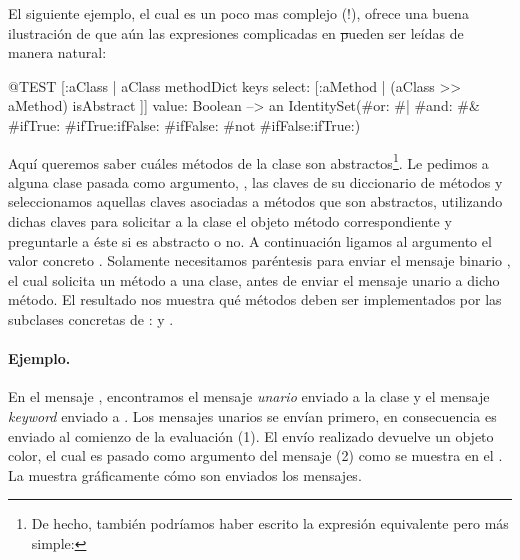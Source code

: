 \documentclass[a4paper,10pt,twoside]{book}
\begin{document}
El siguiente ejemplo, el cual es un poco mas complejo (!), ofrece una buena ilustraci\'on de que a\'un las expresiones complicadas en \st pueden ser le\'idas de manera natural:
\begin{code}{@TEST}
[:aClass | aClass methodDict keys select: [:aMethod | (aClass >> aMethod) isAbstract ]] value: Boolean --> an IdentitySet(#or: #| #and: #& #ifTrue: #ifTrue:ifFalse: #ifFalse: #not #ifFalse:ifTrue:)
\end{code}
\noindent
Aqu\'i queremos saber cu\'ales m\'etodos de la clase  son abstractos\footnote{De hecho, tambi\'en podr\'iamos haber escrito la expresi\'on equivalente pero m\'as simple: }.
Le pedimos a alguna clase pasada como argumento, , las claves de su diccionario de m\'etodos y seleccionamos aquellas claves asociadas a m\'etodos que son abstractos, utilizando dichas claves para solicitar a la clase el objeto m\'etodo correspondiente y preguntarle a \'este si es abstracto o no.
A continuaci\'on ligamos al argumento  el valor concreto .
Solamente necesitamos par\'entesis para enviar el mensaje binario \ct{>>}, el cual solicita un m\'etodo a una clase, antes de enviar el mensaje unario \mbox{} a dicho m\'etodo. El resultado nos muestra qu\'e m\'etodos deben ser implementados por las subclases concretas de :  y .



\paragraph{Ejemplo.}
En el mensaje , encontramos el mensaje \emph{unario}  enviado a la clase  y el mensaje \emph{keyword}  enviado a . Los mensajes unarios se env\'ian primero, en consecuencia  es enviado al comienzo de la evaluaci\'on (1). El env\'io realizado devuelve un objeto color, el cual es pasado como argumento del mensaje  (2) como se muestra en el .
La  muestra gr\'aficamente c\'omo son enviados los mensajes.
\end{document}
